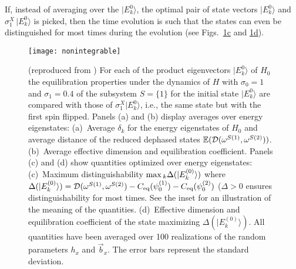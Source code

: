 \documentclass[a4paper,12pt,listof=totoc,index=totoc,bibliography=totoc,headsepline=false,headings=normal,BCOR16.153846mm,DIV12,headinclude,twoside,cleardoublepage=empty,numbers=noenddot,final]{scrreprt}
\newcommand{\refsub}[2]{\hyperref[#1]{\ref*{#1}#2}}
\theoremstyle{mystyle}
\numberwithin{equation}{section}
\numberwithin{figure}{section}
\numberwithin{lemma}{section}
\numberwithin{theorem}{section}
\numberwithin{corollary}{section}
\numberwithin{definition}{section}
\numberwithin{conjecture}{section}
\numberwithin{observation}{section}
\newcommand{\+}{\mkern2mu}
\renewcommand{\max}{\mathchoice{\operatorname*{max}}{\operatorname*{max}}{\mathrm{max}}{\mathrm{max}}} %
\renewcommand{\H}{H}
\newcommand{\ket}[1]{|#1\rangle}
\newcommand{\eqcoef}{C_{\mathrm{eq}}}
\newcommand{\tracedistance}[3][]{
  \ifthenelse{\equal{#2}{}}
  {\ifthenelse{\equal{#3}{}}
    {\mathcal{D}_{#1}}{}
  }{
    \ifthenelse{\equal{#1}{}}
    {\operatorname{\mathcal{D}}(#2,#3)}
    {\operatorname{\mathcal{D}}_{#1}(#2,#3)}
  }
}
\DeclareMathOperator{\1}{\mathds{1}}
\begin{document}
If, instead of averaging over the $\ket{E^0_k}$, the optimal pair of state vectors $\ket{E^0_k}$ and $\sigma^X_1\,\ket{E^0_k}$ is picked, then the time evolution is such that the states can even be distinguished for most times during the evolution (see Figs.~\refsub{fig:absenceofthermalizationnumerics}{c} and \refsub{fig:absenceofthermalizationnumerics}{d}).

\begin{figure}[p]
  \centering
  \texttt{[image: nonintegrable]}
  \caption{(reproduced from \cite{PhysRevLett.10-6})
    For each of the product eigenvectors $\ket{E^0_k}$ of $\H_0$ the equilibration properties under the dynamics of $\H$ with $\sigma_0 = 1$ and $\sigma_1 = 0.4$ of the subsystem $S=\{1\}$ for the initial state $\ket{E^0_k}$ are compared with those of $\sigma^X_1 \ket{E^0_k}$, i.e., the same state but with the first spin flipped.
    Panels (a) and (b) display averages over energy eigenstates:
    (a)~Average $\delta_k$ for the energy eigenstates of $\H_0$ and average distance of the reduced dephased states $\mathbb{E}(\tracedistance{\omega^{S(1)}}{\omega^{S(2)}})$. 
    (b)~Average effective dimension and equilibration coefficient.
    Panels (c) and (d) show quantities optimized over energy eigenstates:
    (c)~Maximum distinguishability $\max_k \Delta(\ket{E_k^{(0)}})$ where $\Delta(\ket{E_k^{(0)}}) = \tracedistance{\omega^{S(1)}}{\omega^{S(2)}} - \eqcoef(\psi^{(1)}_0) - \eqcoef(\psi^{(2)}_0)$ ($\Delta>0$ ensures distinguishability for most times. See the inset for an illustration of the meaning of the quantities.
    (d)~Effective dimension and equilibration coefficient of the state maximizing $\Delta(\ket{E_k^{(0)}})$.
    All quantities have been averaged over 100 realizations of the random parameters $h_x$ and $\vec{b}_x$.
    The error bars represent the standard deviation.
  }
  \label{fig:absenceofthermalizationnumerics}
\end{figure}
\end{document}
